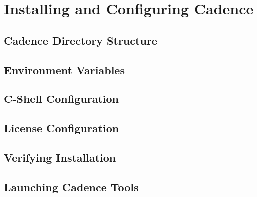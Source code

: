 \chapter{Installing and Configuring Cadence}

\section{Cadence Directory Structure}

\section{Environment Variables}

\section{C-Shell Configuration}

\section{License Configuration}

\section{Verifying Installation}

\section{Launching Cadence Tools}
